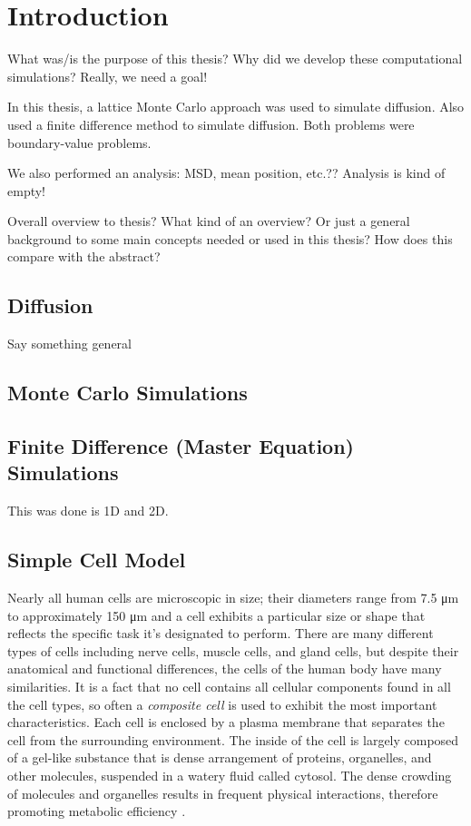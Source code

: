 \chapter{Introduction}

What was/is the purpose of this thesis? Why did we develop these computational simulations? Really, we need a goal!

In this thesis, a lattice Monte Carlo approach was used to simulate diffusion. Also used a finite difference method to simulate diffusion. Both problems were boundary-value problems.

We also performed an analysis: MSD, mean position, etc.?? Analysis is kind of empty!

Overall overview to thesis? What kind of an overview? Or just a general background to some main concepts needed or used in this thesis? How does this compare with the abstract?
	
\section{Diffusion}
Say something general 

\section{Monte Carlo Simulations}


\section{Finite Difference (Master Equation) Simulations}
This was done is 1D and 2D.

\section{Simple Cell Model}

Nearly all human cells are microscopic in size; their diameters range from 7.5 \si{\micro\meter} to approximately 150 \si{\micro\meter} and a cell exhibits a particular size or shape that reflects the specific task it's designated to perform. There are many different types of cells including nerve cells, muscle cells, and gland cells, but despite their anatomical and functional differences, the cells of the human body have many similarities. It is a fact that no cell contains all cellular components found in all the cell types, so often a \textit{composite cell} is used to exhibit the most important characteristics. Each cell is enclosed by a plasma membrane that separates the cell from the surrounding environment. The inside of the cell is largely composed of a gel-like substance that is dense arrangement of proteins, organelles, and other molecules, suspended in a watery fluid called cytosol. The dense crowding of molecules and organelles results in frequent physical interactions, therefore promoting metabolic efficiency \citep{ap}.


